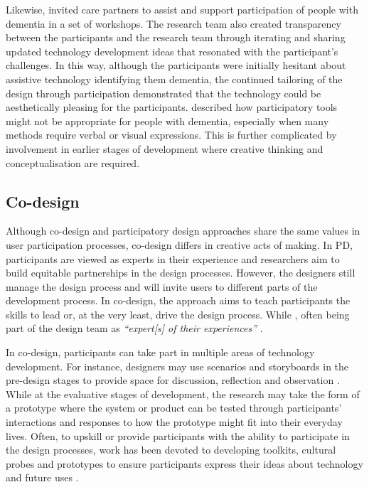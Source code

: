 Likewise, \cite{lindsay_empathy_2012} invited care partners to assist and support participation of people with dementia in a set of workshops. The research team also created transparency between the participants and the research team through iterating and sharing updated technology development ideas that resonated with the participant's challenges. In this way, although the participants were initially hesitant about assistive technology identifying them  dementia, the continued tailoring of the design through participation demonstrated that the technology could be aesthetically pleasing for the participants. \cite{hendriks_challenges_2014} described how participatory tools might not be appropriate for people with dementia, especially when many methods require verbal or visual expressions. This is further complicated by involvement in earlier stages of development where creative thinking and conceptualisation are required.

\subsection{Co-design}
\label{co-design}
Although co-design and participatory design approaches share the same values in user participation processes, co-design differs in creative acts of making. In PD, participants are viewed as experts in their experience and researchers aim to build equitable partnerships in the design processes. However, the designers still manage the design process and will invite users to different parts of the development process. In co-design, the approach aims to teach participants the skills to lead or, at the very least, drive the design process. While , often being part of the design team as \textit{``expert[s] of their experiences''} \citep{visser2005contextmapping}.   

In co-design, participants can take part in multiple areas of technology development. For instance, designers may use scenarios and storyboards in the pre-design stages to provide space for discussion, reflection and observation \citep{bell2019collaborative}. While at the evaluative stages of development, the research may take the form of a prototype where the system or product can be tested through participants' interactions and responses to how the prototype might fit into their everyday lives. Often, to upskill or provide participants with the ability to participate in the design processes, work has been devoted to developing toolkits, cultural probes and prototypes to ensure participants express their ideas about technology and future uses \citep{medina_angarita_what_2020}.

